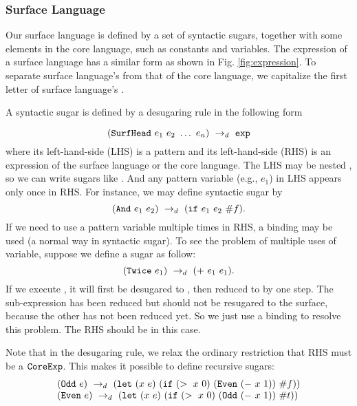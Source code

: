 
\subsubsection{Surface Language}

Our surface language is defined by a set of syntactic sugars, together with some elements in the core language, such as constants and variables. The expression of a surface language has a similar form as shown in Fig.  \ref{fig:expression}. To separate surface language's  from that of the core language, we capitalize the first letter of surface language's .

A syntactic sugar  is defined by a desugaring rule in the following form

\[
\drule{(\m{SurfHead}~e_1~e_2~\ldots~e_n)}{\m{exp}} %
\]
where its left-hand-side (LHS) is a pattern and its left-hand-side (RHS) is an expression of the surface language or the core language. The LHS may be nested , so we can write sugars like . And any pattern variable (e.g., $e_1$) in LHS appears only once in RHS. For instance, we may define syntactic sugar  by
\[
(\mbox{\tt And}~e_1~e_2) ~\rightarrow_d~ (\mbox{\tt if}~e_1~e_2~\#f).
\]
If we need to use a pattern variable multiple times in RHS, a  binding may be used (a normal way in syntactic sugar). To see the problem of multiple uses of variable, suppose we define a sugar as follow:
\[
(\mbox{\tt Twice}~e_1) ~\rightarrow_d~ (+~e_1~e_1).
\]
If we execute , it will first be desugared to , then reduced to  by one step. The sub-expression  has been reduced but should not be resugared to the surface, because the other  has not been reduced yet.
So we just use a  binding to resolve this problem. The RHS should be  in this case.

Note that in the desugaring rule, we relax the ordinary restriction that RHS must be a $\mbox{\tt CoreExp}$. This makes it possible to define recursive sugars:
\[
\begin{array}{l}
(\mbox{\tt Odd}~e) ~\rightarrow_d~ (\mbox{\tt let}~(x~e)~(\mbox{\tt if}~(>~x~0)~(\mbox{\tt Even}~(-~x~1))~\#f))\\
(\mbox{\tt Even}~e) ~\rightarrow_d~ (\mbox{\tt let}~(x~e)~(\mbox{\tt if}~(>~x~0)~(\mbox{\tt Odd}~(-~x~1))~\#t))
\end{array}
\]

